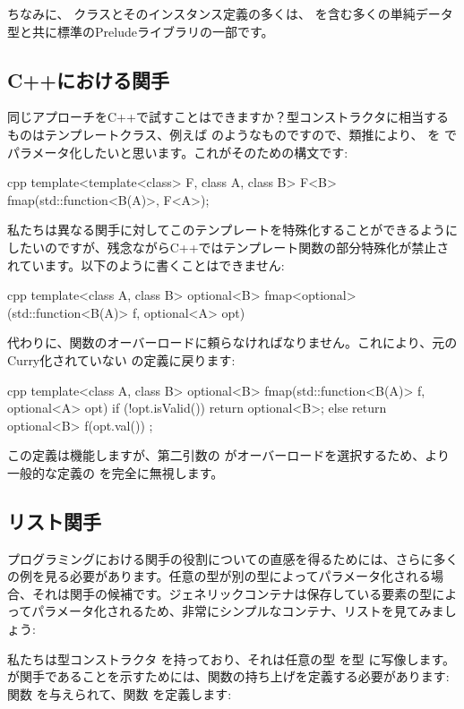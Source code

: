 ちなみに、 クラスとそのインスタンス定義の多くは、 を含む多くの単純データ型と共に標準のPreludeライブラリの一部です。

\subsection{C++における関手}

同じアプローチをC++で試すことはできますか？型コンストラクタに相当するものはテンプレートクラス、例えば  のようなものですので、類推により、 を  でパラメータ化したいと思います。これがそのための構文です: 

\begin{snip}{cpp}
template<template<class> F, class A, class B>
F<B> fmap(std::function<B(A)>, F<A>);
\end{snip}
私たちは異なる関手に対してこのテンプレートを特殊化することができるようにしたいのですが、残念ながらC++ではテンプレート関数の部分特殊化が禁止されています。以下のように書くことはできません: 

\begin{snip}{cpp}
template<class A, class B>
optional<B> fmap<optional>(std::function<B(A)> f, optional<A> opt)
\end{snip}
代わりに、関数のオーバーロードに頼らなければなりません。これにより、元のCurry化されていない  の定義に戻ります: 

\begin{snip}{cpp}
template<class A, class B>
optional<B> fmap(std::function<B(A)> f, optional<A> opt) {
    if (!opt.isValid())
        return optional<B>{};
    else
        return optional<B>{ f(opt.val()) };
}
\end{snip}
この定義は機能しますが、第二引数の  がオーバーロードを選択するため、より一般的な定義の  を完全に無視します。

\subsection{リスト関手}

プログラミングにおける関手の役割についての直感を得るためには、さらに多くの例を見る必要があります。任意の型が別の型によってパラメータ化される場合、それは関手の候補です。ジェネリックコンテナは保存している要素の型によってパラメータ化されるため、非常にシンプルなコンテナ、リストを見てみましょう: 

私たちは型コンストラクタ  を持っており、それは任意の型  を型  に写像します。  が関手であることを示すためには、関数の持ち上げを定義する必要があります: 関数  を与えられて、関数  を定義します: 

